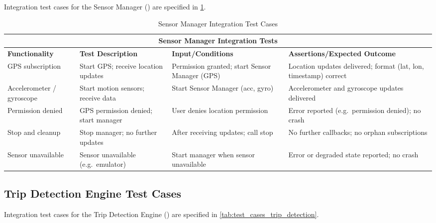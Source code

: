 Integration test cases for the Sensor Manager () are specified in \cref{tab:test_cases_sensor_manager}.

\begin{table}[ht]
\centering
\begin{tabular}{|p{3.2cm}|p{3.8cm}|p{3.2cm}|p{4.8cm}|}
\hline
\multicolumn{4}{|c|}{\textbf{Sensor Manager Integration Tests}} \\ 
\hline
\textbf{Functionality} & \textbf{Test Description} & \textbf{Input/Conditions} & \textbf{Assertions/Expected Outcome} \\
\hline
GPS subscription
 & Start GPS; receive location updates
 & Permission granted; start Sensor Manager (GPS)
 & Location updates delivered; format (lat, lon, timestamp) correct \\ \hline
Accelerometer / gyroscope
 & Start motion sensors; receive data
 & Start Sensor Manager (acc, gyro)
 & Accelerometer and gyroscope updates delivered \\ \hline
Permission denied
 & GPS permission denied; start manager
 & User denies location permission
 & Error reported (e.g.\ permission denied); no crash \\ \hline
Stop and cleanup
 & Stop manager; no further updates
 & After receiving updates; call stop
 & No further callbacks; no orphan subscriptions \\ \hline
Sensor unavailable
 & Sensor unavailable (e.g.\ emulator)
 & Start manager when sensor unavailable
 & Error or degraded state reported; no crash \\ \hline
\end{tabular}
\caption{Sensor Manager Integration Test Cases}
\label{tab:test_cases_sensor_manager}
\end{table}

\subsection{Trip Detection Engine Test Cases}
\label{subsec:trip_detection_engine_test_cases}%

Integration test cases for the Trip Detection Engine () are specified in \cref{tab:test_cases_trip_detection}.

